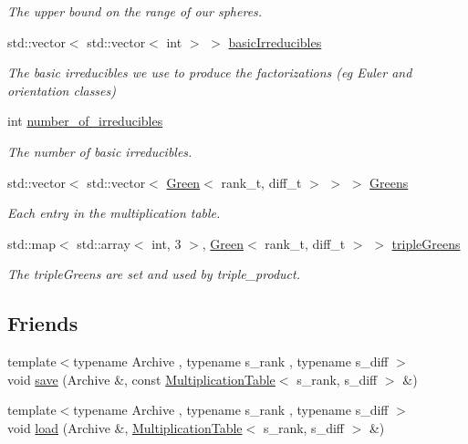 \begin{DoxyCompactItemize}
\begin{DoxyCompactList}\small\item\em The upper bound on the range of our spheres. \end{DoxyCompactList}\item 
std\+::vector$<$ std\+::vector$<$ int $>$ $>$ \hyperlink{classMackey_1_1MultiplicationTable_af6896ea01c087e71533de423d7cf65ac}{basic\+Irreducibles}
\begin{DoxyCompactList}\small\item\em The basic irreducibles we use to produce the factorizations (eg Euler and orientation classes) \end{DoxyCompactList}\item 
int \hyperlink{classMackey_1_1MultiplicationTable_a2a87b9a2f25f4e99c903c8f874fad4fb}{number\+\_\+of\+\_\+irreducibles}
\begin{DoxyCompactList}\small\item\em The number of basic irreducibles. \end{DoxyCompactList}\item 
std\+::vector$<$ std\+::vector$<$ \hyperlink{classMackey_1_1Green}{Green}$<$ rank\+\_\+t, diff\+\_\+t $>$ $>$ $>$ \hyperlink{classMackey_1_1MultiplicationTable_ac9a42c7d9c520844c0d1c91051ae750e}{Greens}
\begin{DoxyCompactList}\small\item\em Each entry in the multiplication table. \end{DoxyCompactList}\item 
std\+::map$<$ std\+::array$<$ int, 3 $>$, \hyperlink{classMackey_1_1Green}{Green}$<$ rank\+\_\+t, diff\+\_\+t $>$ $>$ \hyperlink{classMackey_1_1MultiplicationTable_af6b2afae20bd4a120e9792d1a9dce837}{triple\+Greens}
\begin{DoxyCompactList}\small\item\em The triple\+Greens are set and used by triple\+\_\+product. \end{DoxyCompactList}\end{DoxyCompactItemize}
\subsection*{Friends}
\begin{DoxyCompactItemize}
\item 
{\footnotesize template$<$typename Archive , typename s\+\_\+rank , typename s\+\_\+diff $>$ }\\void \hyperlink{classMackey_1_1MultiplicationTable_ab6423e67b6c7d46e94ebf021316713d6}{save} (Archive \&, const \hyperlink{classMackey_1_1MultiplicationTable}{Multiplication\+Table}$<$ s\+\_\+rank, s\+\_\+diff $>$ \&)
\item 
{\footnotesize template$<$typename Archive , typename s\+\_\+rank , typename s\+\_\+diff $>$ }\\void \hyperlink{classMackey_1_1MultiplicationTable_afe48d7818a420930c571f57c9bae006a}{load} (Archive \&, \hyperlink{classMackey_1_1MultiplicationTable}{Multiplication\+Table}$<$ s\+\_\+rank, s\+\_\+diff $>$ \&)
\end{DoxyCompactItemize}


